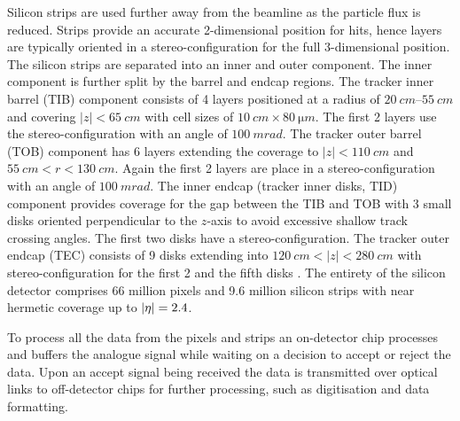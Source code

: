 Silicon strips are used further away from the beamline as the particle flux is
reduced. Strips provide an accurate 2-dimensional position for hits, hence layers
are typically oriented in a stereo-configuration for the full 3-dimensional
position. The silicon strips are separated into an inner and outer component. The
inner component is further split by the barrel and endcap regions. The tracker inner
barrel (TIB) component consists of 4 layers positioned at a radius of
${\SI{20}{cm}}$--${\SI{55}{cm}}$ and covering ${|z|<\SI{65}{cm}}$ with cell sizes of
${\SI{10}{cm}\times\SI{80}{\micro m}}$. The first 2 layers use the
stereo-configuration with an angle of ${\SI{100}{mrad}}$. The tracker outer barrel
(TOB) component has 6 layers extending the coverage to ${|z|<\SI{110}{cm}}$
and ${\SI{55}{cm}<r<\SI{130}{cm}}$. Again the first 2 layers are place in a
stereo-configuration with an angle of ${\SI{100}{mrad}}$. The inner endcap
(tracker inner disks, TID) component provides coverage for the gap between the
TIB and TOB with 3 small disks oriented perpendicular to the $z$-axis to avoid
excessive shallow track crossing angles. The first two disks have a
stereo-configuration. The tracker outer endcap (TEC) consists of 9 disks
extending into ${\SI{120}{cm}<|z|<\SI{280}{cm}}$ with stereo-configuration for
the first 2 and the fifth disks \cite{Borrello:687861}. The entirety of the silicon
detector comprises 66 million pixels and 9.6 million silicon strips with near
hermetic coverage up to $|\eta|=2.4$.

To process all the data from the pixels and strips an on-detector chip processes
and buffers the analogue signal while waiting on a decision to accept or reject the
data. Upon an accept signal being received the data is transmitted over optical
links to off-detector chips for further processing, such as digitisation and data
formatting.

\subsection{\ECAL}

